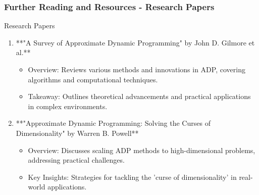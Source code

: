 \documentclass[aspectratio=169]{beamer}
\begin{document}
\begin{frame}[fragile]
    \frametitle{Further Reading and Resources - Research Papers}
    \begin{block}{Research Papers}
        \begin{enumerate}
            \item **"A Survey of Approximate Dynamic Programming" by John D. Gilmore et al.**
                \begin{itemize}
                    \item Overview: Reviews various methods and innovations in ADP, covering algorithms and computational techniques.
                    \item Takeaway: Outlines theoretical advancements and practical applications in complex environments.
                \end{itemize}
            \item **"Approximate Dynamic Programming: Solving the Curses of Dimensionality" by Warren B. Powell**
                \begin{itemize}
                    \item Overview: Discusses scaling ADP methods to high-dimensional problems, addressing practical challenges.
                    \item Key Insights: Strategies for tackling the 'curse of dimensionality' in real-world applications.
                \end{itemize}
        \end{enumerate}
    \end{block}
\end{frame}
\end{document}
